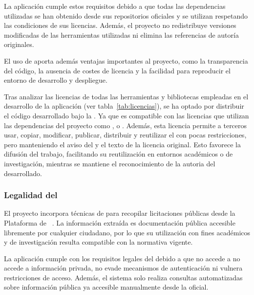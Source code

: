 La aplicación cumple estos requisitos debido a que todas las dependencias utilizadas se han obtenido desde sus repositorios oficiales y se utilizan respetando las condiciones de sus licencias. Además, el proyecto no redistribuye versiones modificadas de las herramientas utilizadas ni elimina las referencias de autoría originales.

El uso de  aporta además ventajas importantes al proyecto, como la transparencia del código, la ausencia de costes de licencia y la facilidad para reproducir el entorno de desarrollo y despliegue.

Tras analizar las licencias de todas las herramientas y bibliotecas empleadas en el desarrollo de la aplicación (ver tabla~\ref{tab:licencias}), se ha optado por distribuir el código desarrollado bajo la . Ya que es compatible con las licencias que utilizan las dependencias del proyecto como ,  o . Además, esta licencia permite a terceros usar, copiar, modificar, publicar, distribuir y reutilizar el  con pocas restricciones, pero manteniendo el aviso del  y el texto de la licencia original. Esto favorece la difusión del trabajo, facilitando su reutilización en entornos académicos o de investigación, mientras se mantiene el reconocimiento de la autoria del  desarrollado. 

\subsubsection{Legalidad del }\label{subsec:webScraping}

El proyecto incorpora técnicas de  para recopilar licitaciones públicas desde la Plataforma de \contsec{}~\cite{legal:contratosSecPub}. La información extraída es documentación pública accesible libremente por cualquier ciudadano, por lo que su utilización con fines académicos y de investigación resulta compatible con la normativa vigente.

La aplicación cumple con los requisitos legales del  debido a que no accede a no accede a información privada, no evade mecanismos de autenticación ni vulnera restricciones de acceso. Además, el sistema solo realiza consultas automatizadas sobre información pública ya accesible manualmente desde la  oficial.

